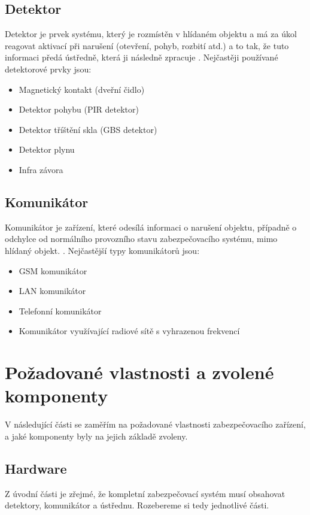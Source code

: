 \documentclass[FM,DP]{tulthesis}  %
\begin{document}
\section{Detektor}
Detektor je prvek systému, který je rozmístěn v hlídaném objektu a má za úkol reagovat aktivací při narušení (otevření, pohyb, rozbití atd.) a to tak, že tuto informaci předá ústředně, která ji následně zpracuje \cite{Electronic security signalisation}. Nejčastěji používané detektorové prvky jsou:

\begin{itemize}
\item Magnetický kontakt (dveřní čidlo)
\item Detektor pohybu (PIR detektor)
\item Detektor tříštění skla (GBS detektor)
\item Detektor plynu
\item Infra závora
\end{itemize} 

\section{Komunikátor}
Komunikátor je zařízení, které odesílá informaci o narušení objektu, případně o odchylce od normálního provozního stavu zabezpečovacího systému, mimo  hlídaný objekt. \cite{Electronic security signalisation}. Nejčastější typy komunikátorů jsou:

\begin{itemize}
\item GSM komunikátor
\item LAN komunikátor
\item Telefonní komunikátor
\item Komunikátor využívající radiové sítě s vyhrazenou frekvencí
\end{itemize} 


\chapter{Požadované vlastnosti a zvolené komponenty}
V následující části se zaměřím na požadované vlastnosti zabezpečovacího zařízení, a jaké komponenty byly na jejich základě zvoleny.

\section{Hardware}
Z úvodní části je zřejmé, že kompletní zabezpečovací systém musí obsahovat detektory, komunikátor a ústřednu. Rozebereme si tedy jednotlivé části.
\end{document}

